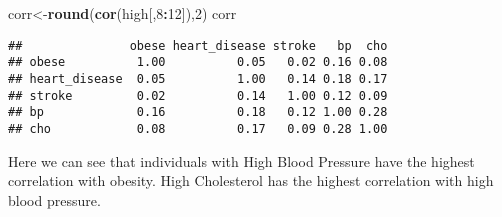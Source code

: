\documentclass[
]{article}
\newenvironment{Shaded}{\begin{snugshade}}{\end{snugshade}}
\newcommand{\DataTypeTok}[1]{\textcolor[rgb]{0.13,0.29,0.53}{#1}}
\newcommand{\DecValTok}[1]{\textcolor[rgb]{0.00,0.00,0.81}{#1}}
\newcommand{\KeywordTok}[1]{\textcolor[rgb]{0.13,0.29,0.53}{\textbf{#1}}}
\newcommand{\NormalTok}[1]{#1}
\newcommand{\OperatorTok}[1]{\textcolor[rgb]{0.81,0.36,0.00}{\textbf{#1}}}
\newcommand{\StringTok}[1]{\textcolor[rgb]{0.31,0.60,0.02}{#1}}
\begin{document}
\begin{Shaded}
\end{Shaded}

\begin{Shaded}
\begin{Highlighting}[]
\NormalTok{corr<-}\KeywordTok{round}\NormalTok{(}\KeywordTok{cor}\NormalTok{(high[,}\DecValTok{8}\OperatorTok{:}\DecValTok{12}\NormalTok{]),}\DecValTok{2}\NormalTok{)}
\NormalTok{corr}
\end{Highlighting}
\end{Shaded}

\begin{verbatim}
##               obese heart_disease stroke   bp  cho
## obese          1.00          0.05   0.02 0.16 0.08
## heart_disease  0.05          1.00   0.14 0.18 0.17
## stroke         0.02          0.14   1.00 0.12 0.09
## bp             0.16          0.18   0.12 1.00 0.28
## cho            0.08          0.17   0.09 0.28 1.00
\end{verbatim}

Here we can see that individuals with High Blood Pressure have the
highest correlation with obesity. High Cholesterol has the highest
correlation with high blood pressure.
\end{document}
